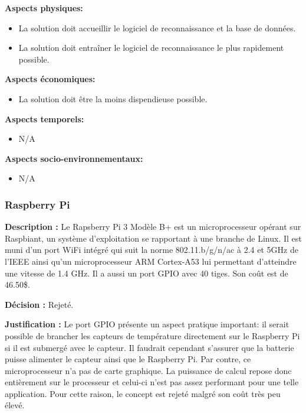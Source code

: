 \textbf{Aspects physiques:}
\begin{itemize}[label = {--}]
    \item La solution doit accueillir le logiciel de reconnaissance et la base de données.
    \item La solution doit entraîner le logiciel de reconnaissance le plus rapidement possible.
\end{itemize}

\textbf{Aspects économiques:}
\begin{itemize}[label = {--}]
    \item La solution doit être la moins dispendieuse possible.
\end{itemize}

\textbf{Aspects temporels:}
\begin{itemize}[label = {--}]
    \item N/A
\end{itemize}

\textbf{Aspects socio-environnementaux:}
\begin{itemize}[label = {--}]
    \item N/A
\end{itemize}

\subsubsection{Raspberry Pi}

\textbf{Description :} Le Rapsberry Pi 3 Modèle B+ est un microprocesseur opérant sur Raspbiant, un système d'exploitation se rapportant à une branche de Linux. Il est muni d'un port WiFi intégré qui suit la norme 802.11.b/g/n/ac à 2.4 et 5GHz de l'IEEE ainsi qu'un microprocesseur ARM Cortex-A53 lui permettant d'atteindre une vitesse de 1.4 GHz. Il a aussi un port GPIO avec 40 tiges. Son coût est de 46.50\$.

\textbf{Décision :} Rejeté.

\textbf{Justification :}  Le port GPIO présente un aspect pratique important: il serait possible de brancher les capteurs de température directement sur le Raspberry Pi si il est submergé avec le capteur. Il faudrait cependant s'assurer que la batterie puisse alimenter le capteur ainsi que le Raspberry Pi. Par contre, ce microprocesseur n'a pas de carte graphique. La puissance de calcul repose donc entièrement sur le processeur et celui-ci n'est pas assez performant pour une telle application. Pour cette raison, le concept est rejeté malgré son coût très peu élevé.

